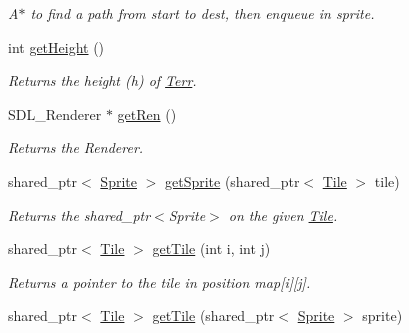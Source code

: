 \begin{DoxyCompactItemize}
\begin{DoxyCompactList}\small\item\em A$\ast$ to find a path from start to dest, then enqueue in sprite. \end{DoxyCompactList}\item 
int \hyperlink{class_terr_a0ef7c8147e12a2291fc84d9ebc67a8df}{get\+Height} ()\hypertarget{class_terr_a0ef7c8147e12a2291fc84d9ebc67a8df}{}\label{class_terr_a0ef7c8147e12a2291fc84d9ebc67a8df}

\begin{DoxyCompactList}\small\item\em Returns the height (h) of \hyperlink{class_terr}{Terr}. \end{DoxyCompactList}\item 
S\+D\+L\+\_\+\+Renderer $\ast$ \hyperlink{class_terr_a85a154825a89e15d9a94292106782438}{get\+Ren} ()\hypertarget{class_terr_a85a154825a89e15d9a94292106782438}{}\label{class_terr_a85a154825a89e15d9a94292106782438}

\begin{DoxyCompactList}\small\item\em Returns the Renderer. \end{DoxyCompactList}\item 
shared\+\_\+ptr$<$ \hyperlink{class_sprite}{Sprite} $>$ \hyperlink{class_terr_abd52d806d98279c1b5e25949acf14b33}{get\+Sprite} (shared\+\_\+ptr$<$ \hyperlink{class_tile}{Tile} $>$ tile)\hypertarget{class_terr_abd52d806d98279c1b5e25949acf14b33}{}\label{class_terr_abd52d806d98279c1b5e25949acf14b33}

\begin{DoxyCompactList}\small\item\em Returns the shared\+\_\+ptr$<$\+Sprite$>$ on the given \hyperlink{class_tile}{Tile}. \end{DoxyCompactList}\item 
shared\+\_\+ptr$<$ \hyperlink{class_tile}{Tile} $>$ \hyperlink{class_terr_aac1903a210962f56187208297c8de12f}{get\+Tile} (int i, int j)\hypertarget{class_terr_aac1903a210962f56187208297c8de12f}{}\label{class_terr_aac1903a210962f56187208297c8de12f}

\begin{DoxyCompactList}\small\item\em Returns a pointer to the tile in position map\mbox{[}i\mbox{]}\mbox{[}j\mbox{]}. \end{DoxyCompactList}\item 
shared\+\_\+ptr$<$ \hyperlink{class_tile}{Tile} $>$ \hyperlink{class_terr_af54a86143ec520d2b50b912c37db4a5a}{get\+Tile} (shared\+\_\+ptr$<$ \hyperlink{class_sprite}{Sprite} $>$ sprite)\hypertarget{class_terr_af54a86143ec520d2b50b912c37db4a5a}{}\label{class_terr_af54a86143ec520d2b50b912c37db4a5a}


\end{DoxyCompactItemize}
